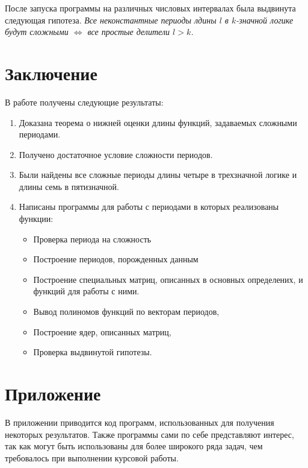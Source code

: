 \documentclass[bibliography=totoc, a4paper, 14pt]{extarticle}
\let\stdsection\section
\renewcommand\section{\newpage\stdsection}
\begin{document}
После запуска программы на различных числовых интервалах была выдвинута следующая гипотеза.
\emph{Все неконстантные периоды лдины $l$ в $k$\nobreakdash-значной логике будут сложными $\Leftrightarrow$
все простые делители $l > k$.}

\section{Заключение}
В работе получены следующие результаты:
\begin{enumerate}
\item Доказана теорема о нижней оценки длины функций, задаваемых сложными периодами.

\item Получено достаточное условие сложности периодов.

\item Были найдены все сложные периоды длины четыре в трехзначной логике и длины семь в пятизначной.

\item Написаны программы для работы с периодами в которых реализованы функции:
\begin{itemize}
\item Проверка периода на сложность
\item Построение периодов, порожденных данным
\item Построение специальных матриц, описанных в основных определених,
и функций для работы с ними.
\item Вывод полиномов функций по векторам периодов,
\item Построение ядер, описанных матриц,
\item Проверка выдвинутой гипотезы.
\end{itemize}
\end{enumerate}


\section{Приложение}

В приложении приводится код программ, использованных для получения некоторых
результатов. Также программы сами по себе представляют интерес, так как могут
быть использованы для более широкого ряда задач, чем требовалось при
выполнении курсовой работы.
\end{document}
